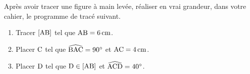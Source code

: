 \documentclass[exercice]{thedocument}%
\begin{document}
%
    Après avoir tracer une figure à main levée, réaliser en vrai grandeur,
    dans votre cahier, le programme de tracé suivant.
    \begin{enumerate}
        \item Tracer $\text{[AB]}$ tel que $\text{AB}=6\,\text{cm}$.
        \item Placer $\text{C}$ tel que $\widehat{\text{BAC}}=90^\circ$ et $\text{AC}=4\,\text{cm}$.
        \item Placer $\text{D}$ tel que $\text{D}\in\text{[AB]}$ et $\widehat{\text{ACD}}=40^\circ$.
    \end{enumerate}
\end{document}
